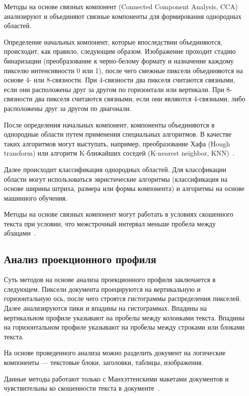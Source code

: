 Методы на основе связных компонент (Connected Component Analysis, CCA) анализируют и объединяют связные компоненты для формирования однородных областей.

Определение начальных компонент, которые впоследствии объединяются, происходит, как правило, следующим образом.
Изображение проходит стадию бинаризации (преобразование к черно-белому формату и назначение каждому пикселю интенсивности 0 или 1), после чего смежные пиксели объединяются на основе 4- или 8-связности.
При 4-связности два пикселя считаются связными, если они расположены друг за другом по горизонтали или вертикали.
При 8-связности два пикселя считаются связными, если они являются 4-связными, либо расположены друг за другом по диагонали.

После определения начальных компонент, компоненты объединяются в однородные области путем применения специальных алгоритмов.
В качестве таких алгоритмов могут выступать, например, преобразование Хафа (Hough transform) или алгоритм K-ближайших соседей (K-nearest neighbor, KNN)~\cite{dla-book}.

Далее происходит классификация однородных областей.
Для классфикации области могут использоваться эвристические алгоритмы (классификация на основе ширины штриха, размера или формы компонента) и алгоритмы на основе машинного обучения.

Методы на основе связных компонент могут работать в условиях скошенного текста при условии, что межстрочный интервал меньше пробела между абзацами~\cite{dla-book}.

\subsection{Анализ проекционного профиля}

Суть методов на основе анализа проекционного профиля заключается в следующем.
Пиксели документа проецируются на вертикальную и горизонтальную ось, после чего строятся гистограммы распределения пикселей.
Далее анализируются пики и впадины на гистограммах.
Впадины на вертикальном профиле указывают на пробелы между колонками текста.
Впадины на горизонтальном профиле указывают на пробелы между строками или блоками текста.

На основе проведенного анализа можно разделить документ на логические компоненты --- текстовые блоки, заголовки, таблицы, изображения.

Данные методы работают только с Манхэттенскими макетами документов и чувствительны ко скошенности текста в документе~\cite{dla-book}.

